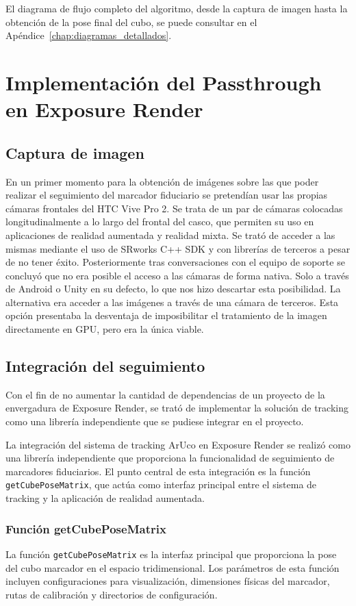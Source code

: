 El diagrama de flujo completo del algoritmo, desde la captura de imagen hasta la obtención de la pose final del cubo, se puede consultar en el Apéndice~\ref{chap:diagramas_detallados}.

\section{Implementación del Passthrough en Exposure Render}
\subsection{Captura de imagen}
En un primer momento para la obtención de imágenes sobre las que poder realizar el seguimiento del marcador fiduciario se pretendían usar las propias cámaras frontales del HTC Vive Pro 2. Se trata de un par de cámaras colocadas longitudinalmente a lo largo del frontal del casco, que permiten su uso en aplicaciones de realidad aumentada y realidad mixta.
Se trató de acceder a las mismas mediante el uso de SRworks C++ SDK y con librerías de terceros a pesar de no tener éxito. Posteriormente tras conversaciones con el equipo de soporte se concluyó que no era posible el acceso a las cámaras de forma nativa. Solo a través de Android o Unity en su defecto, lo que nos hizo descartar esta posibilidad.
La alternativa era acceder a las imágenes a través de una cámara de terceros. Esta opción presentaba la desventaja de imposibilitar el tratamiento de la imagen directamente en GPU, pero era la única viable.

\subsection{Integración del seguimiento}
Con el fin de no aumentar la cantidad de dependencias de un proyecto de la envergadura de Exposure Render, se trató de implementar la solución de tracking como una librería independiente que se pudiese integrar en el proyecto.

La integración del sistema de tracking ArUco en Exposure Render se realizó como una librería independiente que proporciona la funcionalidad de seguimiento de marcadores fiduciarios. El punto central de esta integración es la función \texttt{getCubePoseMatrix}, que actúa como interfaz principal entre el sistema de tracking y la aplicación de realidad aumentada.

\subsubsection{Función getCubePoseMatrix}
La función \texttt{getCubePoseMatrix} es la interfaz principal que proporciona la pose del cubo marcador en el espacio tridimensional. Los parámetros de esta función incluyen configuraciones para visualización, dimensiones físicas del marcador, rutas de calibración y directorios de configuración.

